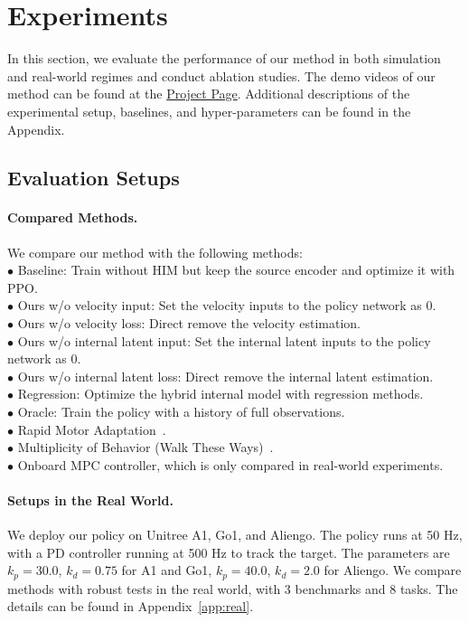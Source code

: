 \section{Experiments}

In this section, we evaluate the performance of our method in both simulation and real-world regimes and conduct ablation studies. 
The demo videos of our method can be found at the \href{https://junfeng-long.github.io/HIMLoco/}{Project Page}.
Additional descriptions of the experimental setup, baselines, and hyper-parameters can be found in the Appendix.

\subsection{Evaluation Setups}

\paragraph{Compared Methods.} We compare our method with the following methods: \\
$\bullet$ Baseline: Train without HIM but keep the source encoder and optimize it with PPO. \\
$\bullet$ Ours w/o velocity input: Set the velocity inputs to the policy network as 0. \\
$\bullet$ Ours w/o velocity loss: Direct remove the velocity estimation. \\
$\bullet$ Ours w/o internal latent input: Set the internal latent inputs to the policy network as 0. \\
$\bullet$ Ours w/o internal latent loss: Direct remove the internal latent estimation. \\
$\bullet$ Regression: Optimize the hybrid internal model with regression methods. \\
$\bullet$ Oracle: Train the policy with a history of full observations. \\
$\bullet$ Rapid Motor Adaptation~\citep{kumar2021rma}. \\
$\bullet$ Multiplicity of Behavior (Walk These Ways)~\citep{margolis2023walk}. \\
$\bullet$ Onboard MPC controller, which is only compared in real-world experiments. 

\paragraph{Setups in the Real World.}
\label{exp:real}
We deploy our policy on Unitree A1, Go1, and Aliengo. The policy runs at 50 Hz, with a PD controller running at 500 Hz to track the target.
The parameters are $k_p = 30.0$, $k_d = 0.75$ for A1 and Go1, $k_p = 40.0$, $k_d = 2.0$ for Aliengo. 
We compare methods with robust tests in the real world, with 3 benchmarks and 8 tasks.
The details can be found in Appendix~\ref{app:real}.


